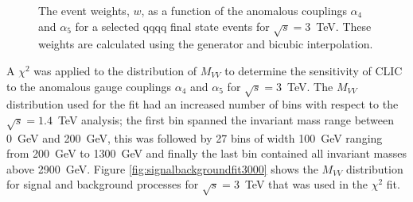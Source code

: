 \begin{figure}[h!]
\centering
{}
\caption[The event weights, $w$, as a function of the anomalous couplings $\alpha_{4}$ and $\alpha_{5}$ for a selected \nu{\nu}qqqq final state events for $\sqrt{s}=3$~TeV.  These weights are calculated using \protect{} the generator and \protect{} bicubic interpolation.]{The event weights, $w$, as a function of the anomalous couplings $\alpha_{4}$ and $\alpha_{5}$ for a selected \nu{\nu}qqqq final state events for $\sqrt{s}=3$~TeV.  These weights are calculated using \protect{} the generator and \protect{} bicubic interpolation.}
\label{fig:eventweights3000}
\end{figure}

A $\chi^{2}$ was applied to the distribution of $M_{VV}$ to determine the sensitivity of CLIC to the anomalous gauge couplings $\alpha_{4}$ and $\alpha_{5}$ for $\sqrt{s}=3$~TeV.  The $M_{VV}$ distribution used for the fit had an increased number of bins with respect to the $\sqrt{s}=1.4$~TeV analysis; the first bin spanned the invariant mass range between 0~GeV and 200~GeV, this was followed by 27 bins of width 100~GeV ranging from 200~GeV to 1300~GeV and finally the last bin contained all invariant masses above 2900~GeV.  Figure \ref{fig:signalbackgroundfit3000} shows the $M_{VV}$ distribution for signal and background processes for $\sqrt{s}=3$~TeV that was used in the $\chi^{2}$ fit.  

